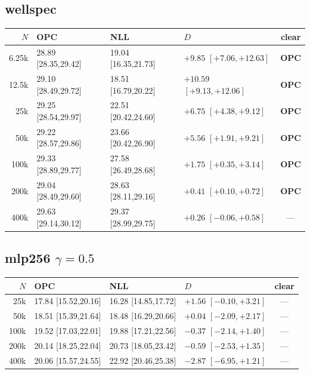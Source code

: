 \documentclass[10pt]{article}
\begin{document}
\subsection*{wellspec}
{\scriptsize
\begin{tabular}{@{}r lll c@{}}
\toprule
$N$ & OPC & NLL & $D$ & clear \\
\midrule
6.25k & 28.89 [28.35,29.42] & 19.04 [16.35,21.73] & $+9.85$ $[+7.06,+12.63]$ & \textbf{OPC} \\
12.5k & 29.10 [28.49,29.72] & 18.51 [16.79,20.22] & $+10.59$ $[+9.13,+12.06]$ & \textbf{OPC} \\
25k & 29.25 [28.54,29.97] & 22.51 [20.42,24.60] & $+6.75$ $[+4.38,+9.12]$ & \textbf{OPC} \\
50k & 29.22 [28.57,29.86] & 23.66 [20.42,26.90] & $+5.56$ $[+1.91,+9.21]$ & \textbf{OPC} \\
100k & 29.33 [28.89,29.77] & 27.58 [26.49,28.68] & $+1.75$ $[+0.35,+3.14]$ & \textbf{OPC} \\
200k & 29.04 [28.49,29.60] & 28.63 [28.11,29.16] & $+0.41$ $[+0.10,+0.72]$ & \textbf{OPC} \\
400k & 29.63 [29.14,30.12] & 29.37 [28.99,29.75] & $+0.26$ $[-0.06,+0.58]$ & — \\
\bottomrule
\end{tabular}}

\subsection*{mlp256 $\gamma{=}0.5$}
{\scriptsize
\begin{tabular}{@{}r lll c@{}}
\toprule
$N$ & OPC & NLL & $D$ & clear \\
\midrule
25k & 17.84 [15.52,20.16] & 16.28 [14.85,17.72] & $+1.56$ $[-0.10,+3.21]$ & — \\
50k & 18.51 [15.39,21.64] & 18.48 [16.29,20.66] & $+0.04$ $[-2.09,+2.17]$ & — \\
100k & 19.52 [17.03,22.01] & 19.88 [17.21,22.56] & $-0.37$ $[-2.14,+1.40]$ & — \\
200k & 20.14 [18.25,22.04] & 20.73 [18.05,23.42] & $-0.59$ $[-2.53,+1.35]$ & — \\
400k & 20.06 [15.57,24.55] & 22.92 [20.46,25.38] & $-2.87$ $[-6.95,+1.21]$ & — \\
\bottomrule
\end{tabular}}
\end{document}
